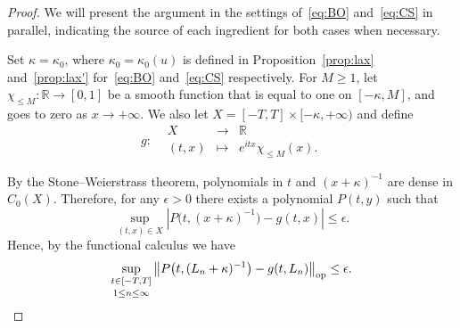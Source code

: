 \documentclass [11pt] {article}
\newcommand{\<}{\langle}
\renewcommand{\>}{\rangle}
\newcommand{\op}{\textup{op}}
\begin{document}
\begin{proof}
We will present the argument in the settings of~\eqref{eq:BO} and~\eqref{eq:CS} in parallel, indicating the source of each ingredient for both cases when necessary.

Set $\kappa = \kappa_0$, where $\kappa_0 = \kappa_0(u)$ is defined in Proposition~\ref{prop:lax} and~\ref{prop:lax'} for~\eqref{eq:BO} and~\eqref{eq:CS} respectively.
For $M \ge 1$, let $\chi_{\leq M}: \mathbb{R} \to  [0,1]$ be a smooth function that is equal to one on $[-\kappa, M]$, and goes to zero as $x\to +\infty$. We also let $X = [-T,T] \times [ -\kappa, +\infty)$ and define
%
\[ g \colon
\begin{array}{rccl}
 &X & \longrightarrow & \mathbb{R} \\
&(t, x) & \longmapsto & e^{itx} \chi_{\leq M}(x).
\end{array}\]
%

By the Stone--Weierstrass theorem, polynomials in $t$ and $(x+\kappa)^{-1}$ are dense in $C_{0}(X)$.  Therefore, for any $\epsilon>0$ there exists a polynomial $P(t,y)$ 
such that
\[
\sup_{(t,x)\in X} \left|P\big(t,(x+\kappa)^{-1}\big) - g(t,x)\right| \le \epsilon.
\] 
Hence, by the functional calculus we have
\begin{equation}\label{eq:secondT}
\sup_{\substack{t \in [-T,T] \\[.2em] 1\le n \le \infty }} \left\| P\big(t, (L_n + \kappa)^{-1}\big) - g(t, L_n)\right\|_{\op} \le \epsilon.
\end{equation}
%


\end{proof}
\end{document}
